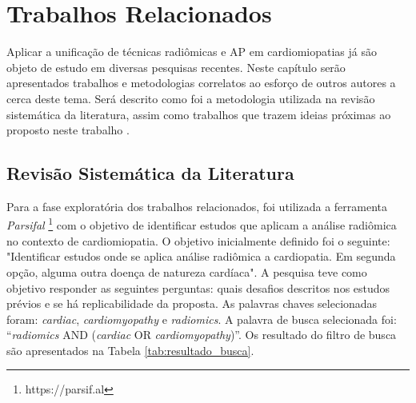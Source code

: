 \chapter{Trabalhos Relacionados} 
\label{chap:trab_relacionados}


Aplicar a unificação de técnicas radiômicas e \gls{AP} em cardiomiopatias já são objeto de estudo em diversas pesquisas recentes.
Neste capítulo serão apresentados trabalhos e metodologias correlatos ao esforço de outros autores a cerca deste tema. Será descrito como foi a metodologia utilizada na revisão sistemática da literatura, assim como trabalhos que trazem ideias próximas ao proposto neste trabalho \cite{petersenGuidelinesConductingSystematic2015a}.

\section{Revisão Sistemática da Literatura} 
\label{sec:rev_sistematica}

Para a fase exploratória dos trabalhos relacionados, foi utilizada a ferramenta \textit{Parsifal} \footnote{https://parsif.al} com o objetivo de identificar estudos que aplicam a análise radiômica no contexto de cardiomiopatia. O objetivo inicialmente definido foi o seguinte: "Identificar estudos onde se aplica análise radiômica a cardiopatia. Em segunda opção, alguma outra doença de natureza cardíaca". A pesquisa teve como objetivo responder as seguintes perguntas: quais desafios descritos nos estudos prévios e se há replicabilidade da proposta. As palavras chaves selecionadas foram: \textit{cardiac}, \textit{cardiomyopathy} e \textit{radiomics}. A palavra de busca selecionada foi: ``\textit{radiomics} AND (\textit{cardiac} OR \textit{cardiomyopathy})''. Os resultado do filtro de busca são apresentados na Tabela \ref{tab:resultado_busca}. 


